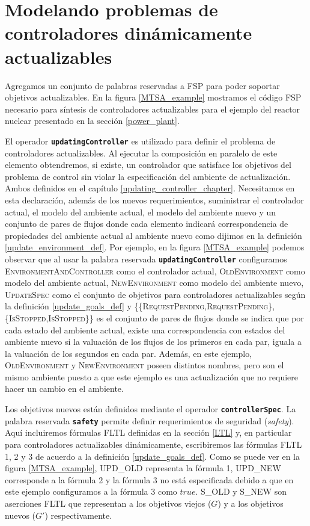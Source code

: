 \section{Modelando problemas de controladores dinámicamente actualizables}

Agregamos un conjunto de palabras reservadas a FSP para poder soportar objetivos actualizables. En la figura
\ref{MTSA_example} mostramos el código FSP necesario para síntesis de controladores actualizables para el ejemplo del reactor nuclear
presentado en la sección \ref{power_plant}.

El operador \texttt{\textbf{updatingController}} es utilizado para definir el problema de controladores
actualizables. Al ejecutar la composición en paralelo de este elemento obtendremos, si existe, un controlador que satisface los
objetivos del problema de control sin violar la especificación del ambiente de actualización. Ambos definidos en el
capítulo \ref{updating_controller_chapter}. Necesitamos en esta declaración, además de los nuevos requerimientos, suministrar
el controlador actual, el modelo del ambiente actual, el modelo del ambiente nuevo y un conjunto de pares de flujos
donde cada elemento indicará correspondencia de propiedades del ambiente actual al ambiente nuevo como dijimos en la
definición \ref{update_environment_def}. Por ejemplo, en la figura \ref{MTSA_example} podemos observar que al usar la
palabra reservada \texttt{\textbf{updatingController}} configuramos \textsc{EnvironmentAndController} como el
controlador actual, \textsc{OldEnvironment} como modelo del ambiente actual, \textsc{NewEnvironment} como modelo del
ambiente nuevo, \textsc{UpdateSpec} como el conjunto de objetivos para controladores actualizables según la
definición \ref{update_goals_def} y \textsc{\{\{RequestPending,RequestPending\},
\{IsStopped,IsStopped\}\}} es el conjunto de pares de flujos donde se indica que por cada estado del ambiente actual,
existe una correspondencia con estados del ambiente nuevo si la valuación de los flujos de los primeros en cada par,
iguala a la valuación de los segundos en cada par. Además, en este ejemplo, \textsc{OldEnvironment} y
\textsc{NewEnvironment} poseen distintos nombres, pero son el mismo ambiente puesto a que este ejemplo es una
actualización que no requiere hacer un cambio en el ambiente.

Los objetivos nuevos están definidos mediante el operador \texttt{\textbf{controllerSpec}}. La palabra reservada
\texttt{\textbf{safety}} permite definir requerimientos de seguridad (\emph{safety}). Aquí incluiremos fórmulas
FLTL definidas en la sección \ref{LTL} y, en particular para controladores actualizables dinámicamente, escribiremos las
fórmulas FLTL 1, 2 y 3 de acuerdo a la definición \ref{update_goals_def}. Como se puede ver en la figura \ref{MTSA_example},
\textsc{UPD\_OLD} representa la fórmula 1, \textsc{UPD\_NEW} corresponde a la fórmula 2 y la fórmula 3 no está
especificada debido a que en este ejemplo configuramos a la fórmula 3 como $true$. \textsc{S\_OLD} y \textsc{S\_NEW} son
aserciones FLTL que representan a los objetivos viejos ($G$) y a los objetivos nuevos ($G'$) respectivamente.

